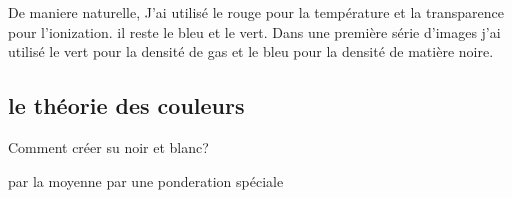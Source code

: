 De maniere naturelle, J'ai utilisé le rouge pour  la température et la transparence pour l'ionization.
il reste le bleu et le vert.
Dans une première série d'images j'ai utilisé le vert pour la densité de gas et le bleu pour la densité de matière noire.

\subsection{le théorie des couleurs}
Comment créer su noir et blanc?

par la moyenne 
par une ponderation spéciale

